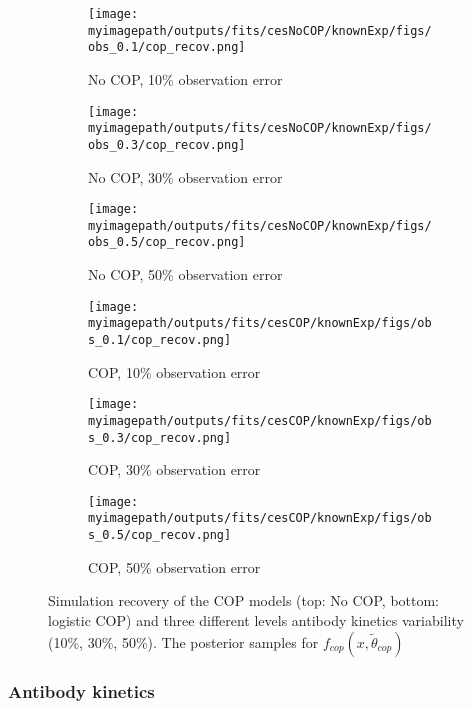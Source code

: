 \documentclass{article}
\newcommand{\myimagepath}{/Users/davidhodgson/Dropbox/Mac (3)/Documents/research/Rpackages/rjmc/}
\begin{document}
\begin{figure}[H]
\label{fit1:cop}
    \centering
    \begin{subfigure}{0.31\textwidth}
        \centering
        \texttt{[image: \\myimagepath/outputs/fits/cesNoCOP/knownExp/figs/obs\_0.1/cop\_recov.png]}
        \caption{No COP, 10\% observation error}
    \end{subfigure}
    \begin{subfigure}{0.31\textwidth}
        \centering
        \texttt{[image: \\myimagepath/outputs/fits/cesNoCOP/knownExp/figs/obs\_0.3/cop\_recov.png]}
        \caption{No COP, 30\% observation error}
    \end{subfigure}
    \begin{subfigure}{0.31\textwidth}
        \centering
        \texttt{[image: \\myimagepath/outputs/fits/cesNoCOP/knownExp/figs/obs\_0.5/cop\_recov.png]}
        \caption{No COP, 50\% observation error}
    \end{subfigure}
    
  \begin{subfigure}{0.31\textwidth}
        \centering
        \texttt{[image: \\myimagepath/outputs/fits/cesCOP/knownExp/figs/obs\_0.1/cop\_recov.png]}
        \caption{ COP, 10\% observation error}
    \end{subfigure}
    \begin{subfigure}{0.31\textwidth}
        \centering
        \texttt{[image: \\myimagepath/outputs/fits/cesCOP/knownExp/figs/obs\_0.3/cop\_recov.png]}
        \caption{ COP, 30\% observation error}
    \end{subfigure}
    \begin{subfigure}{0.31\textwidth}
        \centering
        \texttt{[image: \\myimagepath/outputs/fits/cesCOP/knownExp/figs/obs\_0.5/cop\_recov.png]}
        \caption{ COP, 50\% observation error}
    \end{subfigure}
    
    \caption{Simulation recovery of the COP models (top: No COP, bottom: logistic COP) and three different levels antibody kinetics variability (10\%, 30\%, 50\%). The posterior samples for $f_{cop}(x, \tilde{\theta}_{cop})$ }
\end{figure}


\subsubsection{Antibody kinetics}
\end{document}
